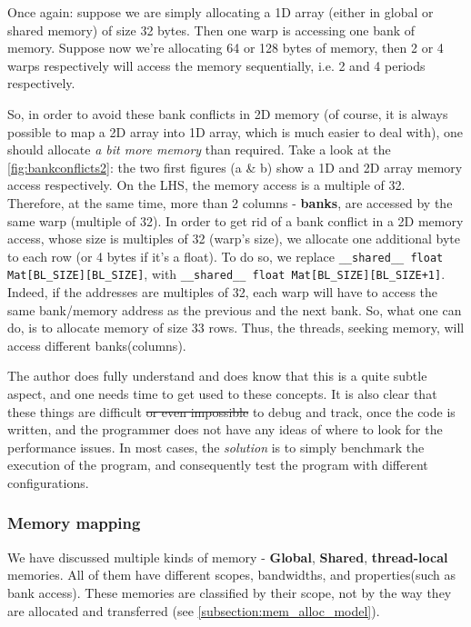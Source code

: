 Once again: suppose we are simply allocating a 1D array (either in global or shared memory) of size 32 bytes. Then one warp is accessing one bank of memory. 
Suppose now we're allocating 64 or 128 bytes of memory, then 2 or 4 warps respectively will access the memory sequentially, i.e. 2 and 4 periods respectively.

So, in order to avoid these bank conflicts in 2D memory (of course, it is always possible to map a 2D array into 1D array, which is much easier to deal with), one should allocate 
\textit{a bit more memory} than required. Take a look at the \autoref{fig:bankconflicts2}: the two first figures (a \& b) show a 1D and 2D array memory access respectively. 
On the LHS, the memory access is a multiple of 32. Therefore, at the same time, more than 2 columns - \textbf{banks}, are accessed by the same warp (multiple of 32). 
In order to get rid of a bank conflict in a 2D memory access, whose size is multiples of 32 (warp's size), we allocate one additional byte to each row (or 4 bytes if it's a float).
To do so, we replace \verb|__shared__ float Mat[BL_SIZE][BL_SIZE]|, with \verb|__shared__ float Mat[BL_SIZE][BL_SIZE+1]|. Indeed, if the addresses are multiples of 32, each warp will 
have to access the same bank/memory address as the previous and the next bank. So, what one can do, is to allocate memory of size 33 rows. Thus, the threads, seeking memory, will 
access different banks(columns).

The author does fully understand and does know that this is a quite subtle aspect, and one needs time to get used 
to these concepts. It is also clear that these things are difficult \sout{or even impossible} to debug and track, once the code is written, and the programmer 
does not have any ideas of where to look for the performance issues. In most cases, 
the \textit{solution} is to simply benchmark the execution of the program, and consequently test the program with different configurations. 



\subsubsection{Memory mapping}
\label{subsub:mem_mapping}
We have discussed multiple kinds of memory - \textbf{Global}, \textbf{Shared}, 
\textbf{thread-local} memories. All of them have different scopes, 
bandwidths, and properties(such as bank access). These memories are classified by their scope, 
not by the way they are allocated and transferred (see \ref{subsection:mem_alloc_model}).

